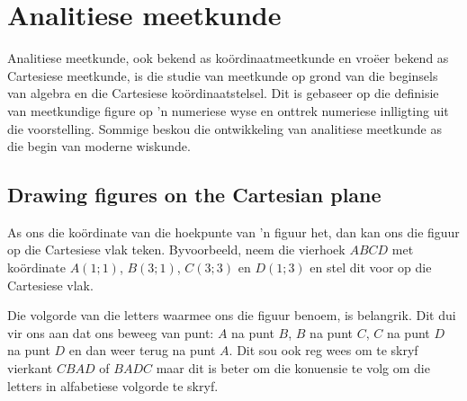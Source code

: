 \chapter{Analitiese meetkunde}
Analitiese meetkunde, ook bekend as koördinaatmeetkunde en vroëer bekend as Cartesiese meetkunde, is die studie van meetkunde op grond van die beginsels van algebra en die Cartesiese koördinaatstelsel. Dit is gebaseer op die definisie van meetkundige figure op ’n numeriese wyse en onttrek numeriese inlligting uit die voorstelling. Sommige beskou die ontwikkeling van analitiese meetkunde as die begin van moderne wiskunde.

\par 
{}

\section{Drawing figures on the Cartesian plane}
As ons die koördinate van die hoekpunte van ’n figuur het, dan kan ons die figuur op die Cartesiese vlak teken.
Byvoorbeeld, neem die vierhoek $ABCD$ met koördinate $A(1;1)$, $B(3;1)$, $C(3;3)$ en $D(1;3)$ en stel dit voor op die Cartesiese vlak. \par 

\setcounter{subfigure}{0}
\begin{figure}[H] %
\begin{center}
\end{center}
\label{fig:cartesianplane}
\end{figure} 

Die volgorde van die letters waarmee ons die figuur benoem, is belangrik. Dit dui vir ons aan dat ons beweeg van punt: $A$ na punt $B$, $B$ na punt $C$, $C$ na punt $D$ na punt $D$  en dan weer terug na punt  $A$. Dit sou ook reg wees om te skryf vierkant $CBAD$ of $BADC$ maar dit is beter om die konuensie te volg om die letters in alfabetiese volgorde te skryf.     

